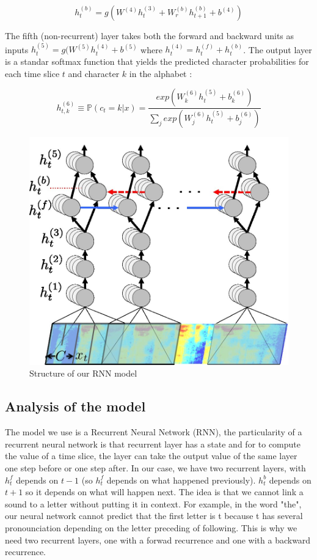 \documentclass[12pt]{article}
\begin{document}
\[ h_t^{(b)} = g(W^{(4)}h_t^{(3)} + W_r^{(b)}h_{t+1}^{(b)} + b^{(4)}) \]

The fifth (non-recurrent) layer takes both the forward and backward units as inputs $h_t^{(5)} = g(W^{(5)}h_t^{(4)} + b^{(5)} $ where $h_t^{(4)} = h_t^{(f)} + h_t^{(b)}$. The output layer is a standar softmax function that yields the predicted character probabilities for each time slice $t$ and character $k$ in the alphabet :

\[ h_{t,k}^{(6)} \equiv \mathbb{P}(c_t=k | x) = \frac{exp(W_k^{(6)}h_t^{(5)} + b_k^{(6)})}{\sum_j exp(W_j^{(6)}h_t^{(5)} + b_j^{(6)})} \]


\begin{figure}[H]
  \begin{center}
    \includegraphics[scale=0.20]{images/photo.jpg}
    \caption{Structure of our RNN model}
  \end{center}
\end{figure}

\subsection{Analysis of the model}
The model we use is a Recurrent Neural Network (RNN), the particularity of a recurrent neural network is that recurrent layer has a state and for to compute the value of a time slice, the layer can take the output value of the same layer one step before or one step after. In our case, we have two recurrent layers, with $h_t^f$ depends on $t-1$ (so $h_t^f$ depends on what happened previously). $h_t^b$ depends on $t+1$ so it depends on what will happen next. The idea is that we cannot link a sound to a letter without putting it in context. For example, in the word "the", our neural network cannot predict that the first letter is t because t has several pronounciation depending on the letter preceding of following. This is why we need two recurrent layers, one with a forwad recurrence and one with a backward recurrence.
\end{document}

